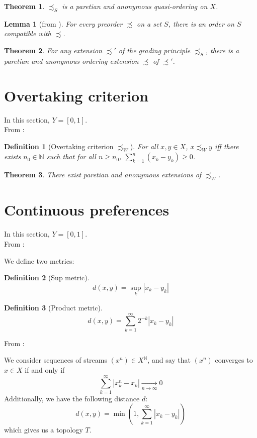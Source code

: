 \documentclass{article}
\newtheorem{definition}{Definition}
\newtheorem{theorem}{Theorem}
\newtheorem{lemma}{Lemma}
\begin{document}
\begin{theorem}
  $\precsim_S$ is a paretian and anonymous quasi-ordering on $X$.
\end{theorem}

\begin{lemma}[from \cite{szpilrajn30}]
  For every preorder $\precsim$ on a set $S$, there is an order on
  $S$ compatible with $\precsim$.
\end{lemma}

\begin{theorem}
  For any extension $\precsim'$ of the grading principle 
  $\precsim_S$, there is a paretian
  and anonymous ordering extension $\precsim$ of $\precsim'$.
\end{theorem}


\section{Overtaking criterion}
In this section, $Y=[0,1]$.
\smallskip\\
From \cite{svensson80}:
\begin{definition}[Overtaking criterion $\precsim_W$]
  For all $x,y\in X$, $x \precsim_W y$ iff there exists
  $n_0\in\mathbb{N}$ such that for all $n\geq n_0$,
  $\sum_{k=1}^n (x_k - y_k)\geq 0$.
\end{definition}

\begin{theorem}
  There exist paretian and anonymous extensions of $\precsim_W$.
\end{theorem}


\section{Continuous preferences}
In this section, $Y=[0,1]$.
\smallskip\\
From \cite{diamond65}:\smallskip\par
We define two metrics:
\begin{definition}[Sup metric]
  \[d(x,y)=\sup_k |x_k - y_k|\]
\end{definition}
\begin{definition}[Product metric]
  \[d(x,y)=\sum_{k=1}^\infty 2^{-k}|x_k - y_k|\]
\end{definition}

\bigskip
From \cite{svensson80}:\smallskip\par
We consider sequences of streams $(x^n)\in X^\mathbb{N}$, and say that
$(x^n)$ converges to $x\in X$ if and only if
\[\sum_{k=1}^\infty |x^n_k - x_k| \underset{n\rightarrow\infty}{\rightarrow}0\]
Additionally, we have the following distance $d$:
\[d(x,y)=\min\left(1,\sum_{k=1}^\infty |x_k - y_k|\right)\]
which gives us a topology $T$.
\end{document}
